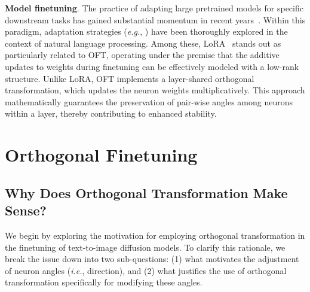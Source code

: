 \textbf{Model finetuning}. The practice of adapting large pretrained models for specific downstream tasks has gained substantial momentum in recent years~\cite{devlin2018bert,brown2020language,he2022masked}. Within this paradigm, adaptation strategies (\emph{e.g.}, \cite{hulora2022,houlsby2019parameter,pfeiffer2020adapterfusion}) have been thoroughly explored in the context of natural language processing. Among these, LoRA~\cite{hulora2022} stands out as particularly related to OFT, operating under the premise that the additive updates to weights during finetuning can be effectively modeled with a low-rank structure. Unlike LoRA, OFT implements a layer-shared orthogonal transformation, which updates the neuron weights multiplicatively. This approach mathematically guarantees the preservation of pair-wise angles among neurons within a layer, thereby contributing to enhanced stability.

\section{Orthogonal Finetuning}

\subsection{Why Does Orthogonal Transformation Make Sense?}

We begin by exploring the motivation for employing orthogonal transformation in the finetuning of text-to-image diffusion models. To clarify this rationale, we break the issue down into two sub-questions: (1) what motivates the adjustment of neuron angles (\emph{i.e.}, direction), and (2) what justifies the use of orthogonal transformation specifically for modifying these angles.


